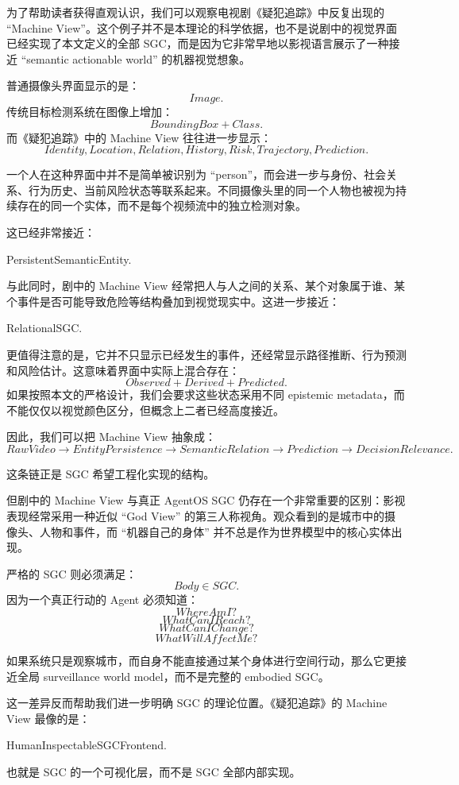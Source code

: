 为了帮助读者获得直观认识，我们可以观察电视剧《疑犯追踪》中反复出现的 ``Machine View''。这个例子并不是本理论的科学依据，也不是说剧中的视觉界面已经实现了本文定义的全部 SGC，而是因为它非常早地以影视语言展示了一种接近 ``semantic actionable world'' 的机器视觉想象。

普通摄像头界面显示的是：
\[
Image.
\]
传统目标检测系统在图像上增加：
\[
BoundingBox+Class.
\]
而《疑犯追踪》中的 Machine View 往往进一步显示：
\[
Identity,
Location,
Relation,
History,
Risk,
Trajectory,
Prediction.
\]

一个人在这种界面中并不是简单被识别为 ``person''，而会进一步与身份、社会关系、行为历史、当前风险状态等联系起来。不同摄像头里的同一个人物也被视为持续存在的同一个实体，而不是每个视频流中的独立检测对象。

这已经非常接近：
\begin{statementbox}
PersistentSemanticEntity.
\end{statementbox}

与此同时，剧中的 Machine View 经常把人与人之间的关系、某个对象属于谁、某个事件是否可能导致危险等结构叠加到视觉现实中。这进一步接近：
\begin{statementbox}
RelationalSGC.
\end{statementbox}

更值得注意的是，它并不只显示已经发生的事件，还经常显示路径推断、行为预测和风险估计。这意味着界面中实际上混合存在：
\[
Observed
+
Derived
+
Predicted.
\]
如果按照本文的严格设计，我们会要求这些状态采用不同 epistemic metadata，而不能仅仅以视觉颜色区分，但概念上二者已经高度接近。

因此，我们可以把 Machine View 抽象成：
\[
RawVideo
\rightarrow
EntityPersistence
\rightarrow
SemanticRelation
\rightarrow
Prediction
\rightarrow
DecisionRelevance.
\]

这条链正是 SGC 希望工程化实现的结构。

但剧中的 Machine View 与真正 AgentOS SGC 仍存在一个非常重要的区别：影视表现经常采用一种近似 ``God View'' 的第三人称视角。观众看到的是城市中的摄像头、人物和事件，而 ``机器自己的身体'' 并不总是作为世界模型中的核心实体出现。

严格的 SGC 则必须满足：
\[
Body\in SGC.
\]
因为一个真正行动的 Agent 必须知道：
\[
WhereAmI?
\]
\[
WhatCanIReach?
\]
\[
WhatCanIChange?
\]
\[
WhatWillAffectMe?
\]

如果系统只是观察城市，而自身不能直接通过某个身体进行空间行动，那么它更接近全局 surveillance world model，而不是完整的 embodied SGC。

这一差异反而帮助我们进一步明确 SGC 的理论位置。《疑犯追踪》的 Machine View 最像的是：
\begin{statementbox}
HumanInspectableSGCFrontend.
\end{statementbox}
也就是 SGC 的一个可视化层，而不是 SGC 全部内部实现。

